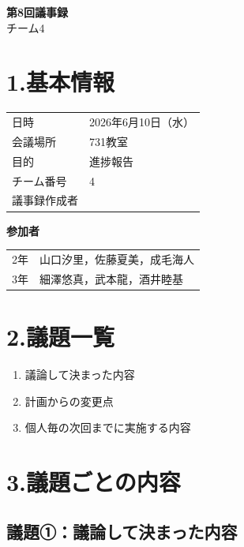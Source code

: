 \documentclass[a4paper,12pt]{ltjsarticle}
\begin{document}
\begin{center}
  {\Large \textbf{第8回議事録}}\\[8pt]
  {\large チーム4}
\end{center}

\vspace{4mm}

\section*{1.基本情報}
\begin{tabular}{ll}
  \toprule
  日時     & 2026年6月10日（水） \\
  会議場所 & 731教室 \\
  目的     & 進捗報告 \\
  チーム番号 & 4 \\
  議事録作成者 &  \\
  \bottomrule
\end{tabular}

\vspace{4mm}
\noindent\textbf{参加者}

\begin{tabular}{ll}
  2年 & 山口汐里，佐藤夏美，成毛海人 \\
  3年 & 細澤悠真，武本龍，酒井睦基 \\
\end{tabular}

\section*{2.議題一覧}
\begin{enumerate}[label=議題\arabic*：]
  \item 議論して決まった内容
  \item 計画からの変更点
  \item 個人毎の次回までに実施する内容
\end{enumerate}

\section*{3.議題ごとの内容}

\subsection*{議題①：議論して決まった内容}
\end{document}
